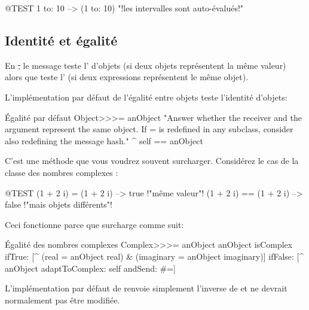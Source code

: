 \documentclass[a4paper,10pt,twoside]{book}
\begin{document}
\begin{code}{@TEST}
1 to: 10 --> (1 to: 10)    "!les intervalles sont auto-évalués!"
\end{code}

\subsection{Identité et égalité}

En \st, le message \ct{=} teste l' d'objets (\ie si deux objets représentent la même valeur) alors que \ct{==} teste l' (\ie si deux expressions représentent le même objet).

L'implémentation par défaut de l'égalité entre objets teste l'identité d'objets:
\begin{method}{Égalité par défaut}
Object>>>= anObject
    "Answer whether the receiver and the argument represent the same object.
    If = is redefined in any subclass, consider also redefining the message hash."
    ^ self == anObject
\end{method}

C'est une méthode que vous voudrez souvent surcharger. Considérez le cas de la classe 
des nombres complexes :

\begin{code}{@TEST}
(1 + 2 i) = (1 + 2 i)   --> true     !"même valeur"!
(1 + 2 i) == (1 + 2 i)  --> false    !"mais objets différents"!
\end{code}

Ceci fonctionne parce que  surcharge \ct{=} comme suit:

\begin{method}{Égalité des nombres complexes}
Complex>>>= anObject
    anObject isComplex
        ifTrue: [^ (real = anObject real) & (imaginary = anObject imaginary)]
        ifFalse: [^ anObject adaptToComplex: self andSend: #=]
\end{method}

L'implémentation par défaut de  renvoie simplement l'inverse 
de  et ne devrait normalement pas être modifiée.
\end{document}
